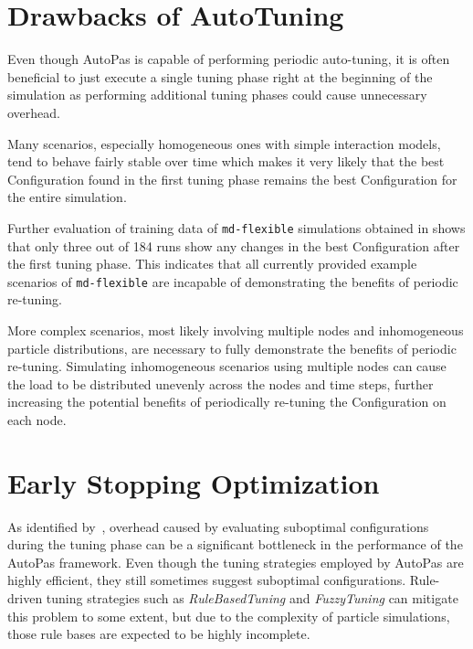 \documentclass[conference]{IEEEtran}
\begin{document}
\section{Drawbacks of AutoTuning}

Even though AutoPas is capable of performing periodic auto-tuning, it is often beneficial to just execute a single tuning phase right at the beginning of the simulation as performing additional tuning phases could cause unnecessary overhead.

Many scenarios, especially homogeneous ones with simple interaction models, tend to behave fairly stable over time which makes it very likely that the best Configuration found in the first tuning phase remains the best Configuration for the entire simulation.

Further evaluation of training data of \texttt{md-flexible} simulations obtained in \cite{lerchner2024} shows that only three out of 184 runs show any changes in the best Configuration after the first tuning phase. This indicates that all currently provided example scenarios of \texttt{md-flexible} are incapable of demonstrating the benefits of periodic re-tuning.

More complex scenarios, most likely involving multiple nodes and inhomogeneous particle distributions, are necessary to fully demonstrate the benefits of periodic re-tuning. Simulating inhomogeneous scenarios using multiple nodes can cause the load to be distributed unevenly across the nodes and time steps, further increasing the potential benefits of periodically re-tuning the Configuration on each node.


\newpage
\newpage


\section{Early Stopping Optimization}

As identified by~\cite{autopas_issue673}\cite{endreport.pdf}\cite{Manuel_Lerchner_Thesis.pdf}, overhead caused by evaluating suboptimal configurations during the tuning phase can be a significant bottleneck in the performance of the AutoPas framework. Even though the tuning strategies employed by AutoPas are highly efficient, they still sometimes suggest suboptimal configurations. Rule-driven tuning strategies such as \textit{RuleBasedTuning} and \textit{FuzzyTuning} can mitigate this problem to some extent, but due to the complexity of particle simulations, those rule bases are expected to be highly incomplete.
\end{document}
